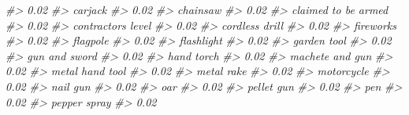 \documentclass[
]{krantz}
\makeatletter
\newenvironment{Shaded}{\begin{snugshade}}{\end{snugshade}}
\newcommand{\CommentTok}[1]{\textcolor[rgb]{0.37,0.37,0.37}{\textit{#1}}}
\newenvironment{kframe}{%
\medskip{}
\setlength{\fboxsep}{.8em}
 \def\at@end@of@kframe{}%
 \ifinner\ifhmode%
  \def\at@end@of@kframe{\end{minipage}}%
  \begin{minipage}{\columnwidth}%
 \fi\fi%
 \def\FrameCommand##1{\hskip\@totalleftmargin \hskip-\fboxsep
 \colorbox{shadecolor}{##1}\hskip-\fboxsep
     \hskip-\linewidth \hskip-\@totalleftmargin \hskip\columnwidth}%
 \MakeFramed {\advance\hsize-\width
   \@totalleftmargin\z@ \linewidth\hsize
   \@setminipage}}%
 {\par\unskip\endMakeFramed%
 \at@end@of@kframe}
\renewenvironment{Shaded}{\begin{kframe}}{\end{kframe}}
\makeatother
\begin{document}
\begin{Shaded}
\begin{Highlighting}[]
\CommentTok{\#\textgreater{}                             0.02 }
\CommentTok{\#\textgreater{}                          carjack }
\CommentTok{\#\textgreater{}                             0.02 }
\CommentTok{\#\textgreater{}                         chainsaw }
\CommentTok{\#\textgreater{}                             0.02 }
\CommentTok{\#\textgreater{}              claimed to be armed }
\CommentTok{\#\textgreater{}                             0.02 }
\CommentTok{\#\textgreater{}               contractor\textquotesingle{}s level }
\CommentTok{\#\textgreater{}                             0.02 }
\CommentTok{\#\textgreater{}                   cordless drill }
\CommentTok{\#\textgreater{}                             0.02 }
\CommentTok{\#\textgreater{}                        fireworks }
\CommentTok{\#\textgreater{}                             0.02 }
\CommentTok{\#\textgreater{}                         flagpole }
\CommentTok{\#\textgreater{}                             0.02 }
\CommentTok{\#\textgreater{}                       flashlight }
\CommentTok{\#\textgreater{}                             0.02 }
\CommentTok{\#\textgreater{}                      garden tool }
\CommentTok{\#\textgreater{}                             0.02 }
\CommentTok{\#\textgreater{}                    gun and sword }
\CommentTok{\#\textgreater{}                             0.02 }
\CommentTok{\#\textgreater{}                       hand torch }
\CommentTok{\#\textgreater{}                             0.02 }
\CommentTok{\#\textgreater{}                  machete and gun }
\CommentTok{\#\textgreater{}                             0.02 }
\CommentTok{\#\textgreater{}                  metal hand tool }
\CommentTok{\#\textgreater{}                             0.02 }
\CommentTok{\#\textgreater{}                       metal rake }
\CommentTok{\#\textgreater{}                             0.02 }
\CommentTok{\#\textgreater{}                       motorcycle }
\CommentTok{\#\textgreater{}                             0.02 }
\CommentTok{\#\textgreater{}                         nail gun }
\CommentTok{\#\textgreater{}                             0.02 }
\CommentTok{\#\textgreater{}                              oar }
\CommentTok{\#\textgreater{}                             0.02 }
\CommentTok{\#\textgreater{}                       pellet gun }
\CommentTok{\#\textgreater{}                             0.02 }
\CommentTok{\#\textgreater{}                              pen }
\CommentTok{\#\textgreater{}                             0.02 }
\CommentTok{\#\textgreater{}                     pepper spray }
\CommentTok{\#\textgreater{}                             0.02 }

\end{Highlighting}
\end{Shaded}
\end{document}
